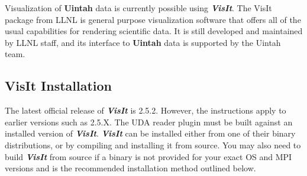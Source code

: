 \documentclass[12pt]{article}
\begin{document}
Visualization of \textbf{Uintah} data is currently possible using
\textbf{\emph{VisIt}}. The VisIt package from LLNL is general purpose
visualization software that offers all of the usual capabilities for
rendering scientific data.  It is still developed and maintained by
LLNL staff, and its interface to \textbf{Uintah} data is supported by
the Uintah team.



\subsection{VisIt Installation}

The latest official release of \textbf{\emph{VisIt}} is 2.5.2.
However, the instructions apply to earlier versions such as 2.5.X.
The UDA reader plugin must be built against an installed version of
\textbf{\emph{VisIt}}.  \textbf{\emph{VisIt}} can be installed either
from one of their binary distributions, or by compiling and installing
it from source.  You may also need to build \textbf{\emph{VisIt}} from
source if a binary is not provided for your exact OS and MPI versions
and is the recommended installation method outlined below.
\end{document}
